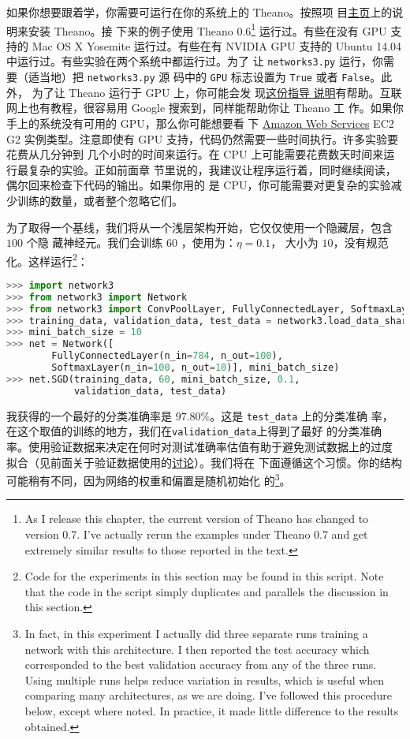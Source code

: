 如果你想要跟着学，你需要可运行在你的系统上的 Theano。按照项
目\href{http://deeplearning.net/software/theano/}{主页}上的说明来安装 Theano。接
下来的例子使用 Theano 0.6\footnote{As I release this chapter, the current
  version of Theano has changed to version 0.7. I've actually rerun the examples
  under Theano 0.7 and get extremely similar results to those reported in the
  text.} 运行过。有些在没有 GPU 支持的 Mac OS X Yosemite 运行过。有些在有 NVIDIA
GPU 支持的 Ubuntu 14.04 中运行过。有些实验在两个系统中都运行过。为了
让 \lstinline!networks3.py! 运行，你需要（适当地）把 \lstinline!networks3.py! 源
码中的 \lstinline!GPU! 标志设置为 \lstinline!True! 或者 \lstinline!False!。此外，
为了让 Theano 运行于 GPU 上，你可能会发
现\href{http://deeplearning.net/software/theano/tutorial/using_gpu.html}{这份指导
  说明}有帮助。互联网上也有教程，很容易用 Google 搜索到，同样能帮助你让 Theano 工
作。如果你手上的系统没有可用的 GPU，那么你可能想要看
下 \href{http://aws.amazon.com/ec2/instance-types/}{Amazon Web Services} EC2 G2
实例类型。注意即使有 GPU 支持，代码仍然需要一些时间执行。许多实验要花费从几分钟到
几个小时的时间来运行。在 CPU 上可能需要花费数天时间来运行最复杂的实验。正如前面章
节里说的，我建议让程序运行着，同时继续阅读，偶尔回来检查下代码的输出。如果你用的
是 CPU，你可能需要对更复杂的实验减少训练\epochs{}的数量，或者整个忽略它们。

为了取得一个基线，我们将从一个浅层架构开始，它仅仅使用一个隐藏层，包含 $100$ 个隐
藏神经元。我们会训练 $60$ \epochs{}，使用\learningrate{}为：$\eta =
0.1$，\minibatch{} 大小为 $10$，没有规范化。这样运行\footnote{Code for the
  experiments in this section may be found in this script. Note that the code in
  the script simply duplicates and parallels the discussion in this section.}：
\begin{lstlisting}[language=Python]
>>> import network3
>>> from network3 import Network
>>> from network3 import ConvPoolLayer, FullyConnectedLayer, SoftmaxLayer
>>> training_data, validation_data, test_data = network3.load_data_shared()
>>> mini_batch_size = 10
>>> net = Network([
        FullyConnectedLayer(n_in=784, n_out=100),
        SoftmaxLayer(n_in=100, n_out=10)], mini_batch_size)
>>> net.SGD(training_data, 60, mini_batch_size, 0.1, 
            validation_data, test_data)
\end{lstlisting}

我获得的一个最好的分类准确率是 $97.80$\%。这是 \lstinline!test_data! 上的分类准确
率，在这个取值的训练\epoch{}的地方，我们在\lstinline!validation_data!上得到了最好
的分类准确率。使用验证数据来决定在何时对测试准确率估值有助于避免测试数据上的过度
拟合（见前面关于验证数据使用的\hyperref[validation_explanation]{讨论}）。我们将在
下面遵循这个习惯。你的结构可能稍有不同，因为网络的权重和偏置是随机初始化
的\footnote{In fact, in this experiment I actually did three separate runs
  training a network with this architecture. I then reported the test accuracy
  which corresponded to the best validation accuracy from any of the three
  runs. Using multiple runs helps reduce variation in results, which is useful
  when comparing many architectures, as we are doing. I've followed this
  procedure below, except where noted. In practice, it made little difference to
  the results obtained.}。


